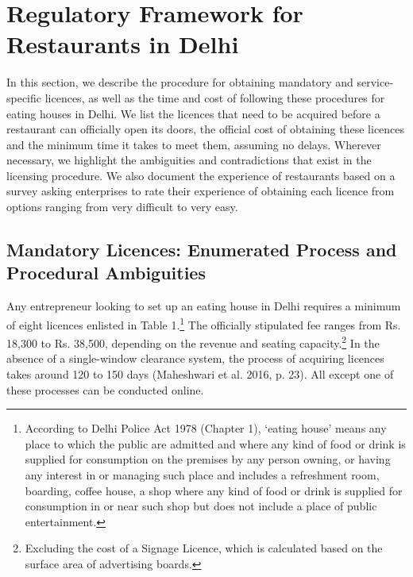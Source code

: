 \documentclass[a4paper, 12pt]{article}
\begin{document}
                    \section{Regulatory Framework for Restaurants in Delhi}
                    \label{sec:1}
                    In this section, we describe the procedure for obtaining mandatory and service-specific licences, as well as the time and cost of following these procedures for eating houses in Delhi. We list the licences that need to be acquired before a restaurant can officially open its doors, the official cost of obtaining these licences and the minimum time it takes to meet them, assuming no delays. Wherever necessary, we highlight the ambiguities and contradictions that exist in the licensing procedure. We also document the experience of restaurants based on a survey asking enterprises to rate their experience of obtaining each licence from options ranging from very difficult to very easy.
                    
                    
                    \subsection{Mandatory Licences: Enumerated Process and Procedural Ambiguities}
                     Any entrepreneur looking to set up an eating house in Delhi requires a minimum of eight licences enlisted in Table 1.\footnote{According to Delhi Police Act 1978 (Chapter 1), ‘eating house’ means any place to which the public are admitted and where any kind of food or drink is supplied for consumption on the premises by any person owning, or having any interest in or managing such place and includes a refreshment room, boarding, coffee house, a shop where any kind of food or drink is supplied for consumption in or near such shop but does not include a place of public entertainment.} The officially stipulated fee ranges from Rs. 18,300 to Rs. 38,500, depending on the revenue and seating capacity.\footnote{Excluding the cost of a Signage Licence, which is calculated based on the surface area of advertising boards.} In the absence of a single-window clearance system, the process of acquiring licences takes around 120 to 150 days (Maheshwari et al. 2016, p. 23). All except one of these processes can be conducted online.
     
\end{document}

